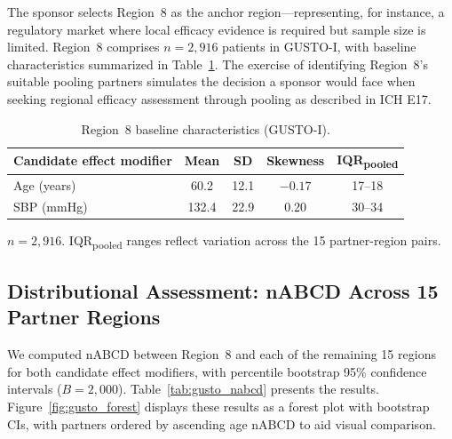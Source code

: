 \documentclass[AMA,Times1COL]{WileyNJDv5}
\begin{document}
The sponsor selects Region~8 as the anchor region---representing, for instance, a regulatory market where local efficacy evidence is required but sample size is limited. Region~8 comprises $n = 2{,}916$ patients in GUSTO-I, with baseline characteristics summarized in Table~\ref{tab:gusto_r8}. The exercise of identifying Region~8's suitable pooling partners simulates the decision a sponsor would face when seeking regional efficacy assessment through pooling as described in ICH E17.\cite{iche17}

\begin{table}[ht]
\centering
\caption{Region~8 baseline characteristics (GUSTO-I).\label{tab:gusto_r8}}
\begin{tabular}{lcccc}
\toprule
\textbf{Candidate effect modifier} & \textbf{Mean} & \textbf{SD} & \textbf{Skewness} & \textbf{IQR\textsubscript{pooled}} \\
\midrule
Age (years) & 60.2 & 12.1 & $-0.17$ & 17--18 \\
SBP (mmHg) & 132.4 & 22.9 & 0.20 & 30--34 \\
\bottomrule
\end{tabular}
\begin{tablenotes}
\item $n = 2{,}916$. IQR\textsubscript{pooled} ranges reflect variation across the 15 partner-region pairs.
\end{tablenotes}
\end{table}

\subsection{Distributional Assessment: nABCD Across 15 Partner Regions}\label{sec:app_nabcd}

We computed nABCD between Region~8 and each of the remaining 15 regions for both candidate effect modifiers, with percentile bootstrap 95\% confidence intervals ($B = 2{,}000$). Table~\ref{tab:gusto_nabcd} presents the results. Figure~\ref{fig:gusto_forest} displays these results as a forest plot with bootstrap CIs, with partners ordered by ascending age nABCD to aid visual comparison.
\end{document}
